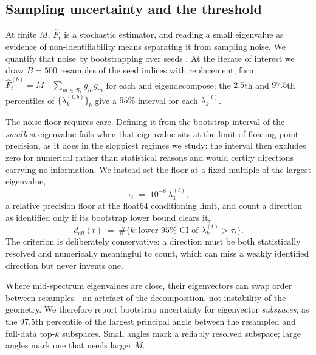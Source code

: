 \documentclass[10pt,twocolumn]{article}
\newcommand{\Fhat}{\hat{F}}
\newcommand{\deff}{d_{\mathrm{eff}}}
\begin{document}
\subsection{Sampling uncertainty and the threshold}
\label{sec:method:bootstrap}

At finite $M$, $\Fhat_t$ is a stochastic estimator, and reading a small eigenvalue
as evidence of non-identifiability means separating it from sampling noise. We
quantify that noise by bootstrapping over seeds \citep{efron1979bootstrap}. At the
iterate of interest we draw $B = 500$ resamples of the seed indices with
replacement, form $\Fhat_t^{(b)} = M^{-1}\sum_{m\in\mathcal{B}_b} g_m g_m^\top$ for
each and eigendecompose; the $2.5$th and $97.5$th percentiles of
$\{\lambda_k^{(t,b)}\}_b$ give a $95\%$ interval for each $\lambda_k^{(t)}$.

The noise floor requires care. Defining it from the bootstrap interval of the
\emph{smallest} eigenvalue fails when that eigenvalue sits at the limit of
floating-point precision, as it does in the sloppiest regimes we study: the interval
then excludes zero for numerical rather than statistical reasons and would certify
directions carrying no information. We instead set the floor at a fixed multiple of
the largest eigenvalue,
\begin{equation}
  \tau_t \;=\; 10^{-8}\,\lambda_1^{(t)},
  \label{eq:tau}
\end{equation}
a relative precision floor at the float64 conditioning limit, and count a direction
as identified only if its bootstrap lower bound clears it,
\begin{equation}
  \deff(t) \;=\; \#\big\{k : \text{lower } 95\%\text{ CI of } \lambda_k^{(t)}
                 > \tau_t\big\}.
\end{equation}
The criterion is deliberately conservative: a direction must be both statistically
resolved and numerically meaningful to count, which can miss a weakly identified
direction but never invents one.

Where mid-spectrum eigenvalues are close, their eigenvectors can swap order between
resamples---an artefact of the decomposition, not instability of the geometry. We
therefore report bootstrap uncertainty for eigenvector \emph{subspaces}, as the
$97.5$th percentile of the largest principal angle between the resampled and
full-data top-$k$ subspaces. Small angles mark a reliably resolved subspace; large
angles mark one that needs larger $M$.
\end{document}
